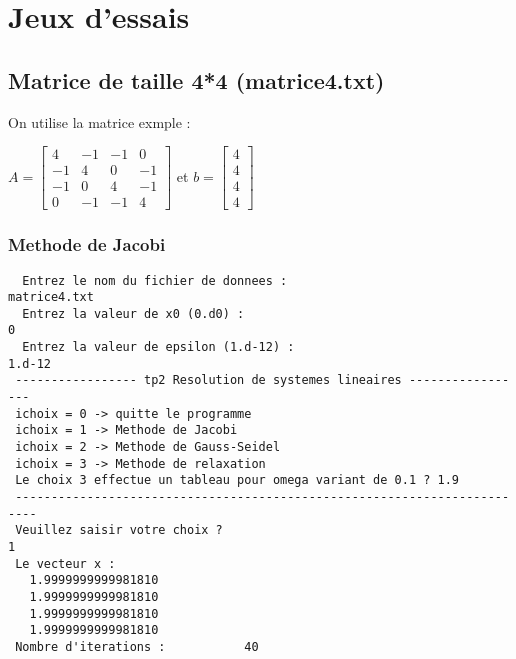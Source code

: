 \documentclass{report}
\begin{document}
\newpage
\section{Jeux d'essais}
\subsection{Matrice de taille 4*4 (matrice4.txt)}
On utilise la matrice exmple :

$A=\left[\begin{array}{rrrr}
 4 & -1 & -1 &  0 \\
-1 &  4 &  0 & -1 \\
-1 &  0 &  4 & -1 \\
 0 & -1 & -1 &  4
\end{array}\right]$
et $b=\left[\begin{array}{rrrr}
4 \\
4 \\
4 \\
4 
\end{array}\right]$

\subsubsection{Methode de Jacobi}
\begin{small}
\begin{verbatim}
  Entrez le nom du fichier de donnees : 
matrice4.txt
  Entrez la valeur de x0 (0.d0) :
0
  Entrez la valeur de epsilon (1.d-12) :
1.d-12
 ----------------- tp2 Resolution de systemes lineaires -----------------
 ichoix = 0 -> quitte le programme
 ichoix = 1 -> Methode de Jacobi
 ichoix = 2 -> Methode de Gauss-Seidel
 ichoix = 3 -> Methode de relaxation
 Le choix 3 effectue un tableau pour omega variant de 0.1 ? 1.9
 -------------------------------------------------------------------------
 Veuillez saisir votre choix ?
1
 Le vecteur x :
   1.9999999999981810
   1.9999999999981810
   1.9999999999981810
   1.9999999999981810
 Nombre d'iterations :           40
\end{verbatim}
\end{small}
\end{document}
